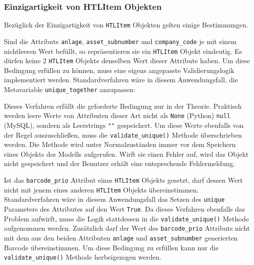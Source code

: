 \hypertarget{einzigartigkeit-von-htlitem-objekten}{%
\subsubsection{Einzigartigkeit von HTLItem
Objekten}\label{einzigartigkeit-von-htlitem-objekten}}

Bezüglich der Einzigartigkeit von \texttt{HTLItem} Objekten gelten
einige Bestimmungen.

Sind die Attribute \texttt{anlage}, \texttt{asset\_subnumber} und
\texttt{company\_code} je mit einem nichtleeren Wert befüllt, so
repräsentieren sie ein \texttt{HTLItem} Objekt eindeutig. Es dürfen
keine 2 \texttt{HTLItem} Objekte denselben Wert dieser Attribute haben.
Um diese Bedingung erfüllen zu können, muss eine eigens angepasste
Validierungslogik implementiert werden. Standardverfahren wäre in diesem
Anwendungsfall, die Metavariable \texttt{unique\_together}
\cite{django-doku-models-options} anzupassen:

\begin{Shaded}
\begin{Highlighting}[]
\OperatorTok{=}\NormalTok{ [[}\NormalTok{,  }\NormalTok{, }\NormalTok{]]}
\end{Highlighting}
\end{Shaded}

Dieses Verfahren erfüllt die geforderte Bedingung nur in der Theorie.
Praktisch werden leere Werte von Attributen dieser Art nicht als
\texttt{None} (Python) \bzw{} \texttt{null} (MySQL), sondern als
Leerstrings \texttt{""} gespeichert. Um diese Werte ebenfalls von der
Regel auszuschließen, muss die \texttt{validate\_unique()} Methode
\cite{django-doku-models-instances} überschrieben werden. Die Methode
wird unter Normalzuständen immer vor dem Speichern eines Objekts des
Modells aufgerufen. Wirft sie einen Fehler auf, wird das Objekt nicht
gespeichert und der Benutzer erhält eine entsprechende Fehlermeldung.

Ist das \texttt{barcode\_prio} Attribut eines \texttt{HTLItem} Objekts
gesetzt, darf dessen Wert nicht mit jenem eines anderen \texttt{HTLItem}
Objekts übereinstimmen. Standardverfahren wäre in diesem Anwendungsfall
das Setzen des \texttt{unique} Parameters des Attributes auf den Wert
\texttt{True}. Da dieses Verfahren ebenfalls das \oa{} Problem aufwirft,
muss die Logik stattdessen in die \texttt{validate\_unique()} Methode
aufgenommen werden. Zusätzlich darf der Wert des \texttt{barcode\_prio}
Attributs nicht mit dem aus den beiden Attributen \texttt{anlage} und
\texttt{asset\_subnumber} generierten Barcode übereinstimmen. Um diese
Bedingung zu erfüllen kann nur die \texttt{validate\_unique()} Methode
herbeigezogen werden.

